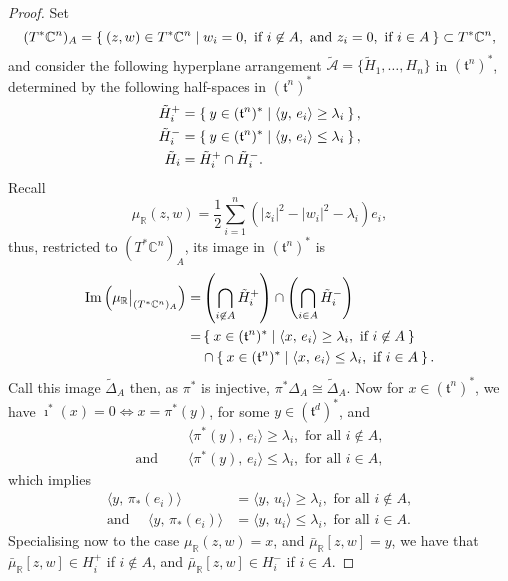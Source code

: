 \documentclass{amsart}
\newcommand{\RR}{\mathbb{R}}
\newcommand{\CC}{\mathbb{C}}
\newcommand{\mcA}{\mathcal{A}}
\newcommand{\mft}{\mathfrak{t}}
\DeclareMathOperator{\Image}{Im}
\newcommand\restr[2]{{%
		\left.\kern-\nulldelimiterspace %
		#1 %
		\vphantom{\big|} %
		\right|_{#2} %
}}
\begin{document}
	\begin{proof}
		Set
		\[
			(T^{\ast}\CC^{n})_{A} = \Set{(z,w) \in T^{\ast}\CC^{n} | w_{i} = 0, \text{ if } i \not\in A, \text{ and } z_{i} = 0, \text{ if } i \in A} \subset T^{\ast}\CC^{n},
		\]
		and consider the following hyperplane arrangement $\tilde{\mcA} = \{ \tilde{H}_{1}, \ldots, H_{n}\}$ in $(\mft^{n})^{\ast}$, determined by the following half-spaces in $(\mft^{n})^{\ast}$
		\begin{align*}
			\tilde{H}_{i}^{+} &= \Set{ y \in (\mft^{n})^{\ast} | \langle y,\, e_{i} \rangle \geq \lambda_{i} }, \\
			\tilde{H}_{i}^{-} &= \Set{ y \in (\mft^{n})^{\ast} | \langle y,\, e_{i} \rangle \leq \lambda_{i} }, \\
			\tilde{H}_{i} &= \tilde{H}_{i}^{+} \cap \tilde{H}_{i}^{-}.
		\end{align*}
		Recall
		\[
			\mu_{\RR}(z,w) = \frac{1}{2}\sum_{i=1}^{n}\left(|z_{i}|^{2} - |w_{i}|^{2} - \lambda_{i} \right)e_{i},
		\]
		thus, restricted to $(T^{\ast}\CC^{n})_{A}$, its image in $(\mft^{n})^{\ast}$ is
		\begin{align*}
			\Image\left(\restr{\mu_{\RR}}{(T^{\ast}\CC^{n})_{A}} \right) =& \left(\bigcap_{i \not\in A} \tilde{H}_{i}^{+}\right) \cap \left(\bigcap_{i \in A} \tilde{H}_{i}^{-}\right) \\
			=& \Set{x \in (\mft^{n})^{\ast} | \langle x,\, e_{i} \rangle \geq \lambda_{i}, \text{ if } i \not\in A } \\
			&\cap \Set{x \in (\mft^{n})^{\ast} | \langle x,\, e_{i} \rangle \leq \lambda_{i}, \text{ if } i \in A } .
		\end{align*}
		Call this image $\tilde{\Delta}_{A}$ then, as $\pi^{\ast}$ is injective, $\pi^{\ast}\Delta_{A} \cong \tilde{\Delta}_{A}$. Now for $x \in (\mft^{n})^{\ast}$, we have $\imath^{\ast}(x) = 0 \iff x = \pi^{\ast}(y)$, for some $y \in (\mft^{d})^{\ast}$, and
		\begin{align*}
			&\langle \pi^{\ast}(y),\, e_{i} \rangle \geq \lambda_{i}, \text{ for all } i \not\in A, \\
			\text{and } \quad  &\langle \pi^{\ast}(y), \, e_{i} \rangle \leq \lambda_{i}, \text{ for all } i \in A,
		\end{align*}
		which implies
		\begin{align*}
		\langle y,\, \pi_{\ast}(e_{i}) \rangle &= \langle y,\, u_{i} \rangle \geq \lambda_{i}, \text{ for all } i \not\in A, \\
		\text{and } \quad  \langle y,\, \pi_{\ast}(e_{i}) \rangle &= \langle y,\, u_{i} \rangle \leq \lambda_{i}, \text{ for all } i \in A.
		\end{align*}
		Specialising now to the case $\mu_{\RR}(z,w) = x$, and $\bar{\mu}_{\RR}[z,w] = y$, we have that $\bar{\mu}_{\RR}[z,w] \in H_{i}^{+}$ if $i \not\in A$, and $\bar{\mu}_{\RR}[z,w] \in H_{i}^{-}$ if $i \in A$.
	\end{proof}
\end{document}
